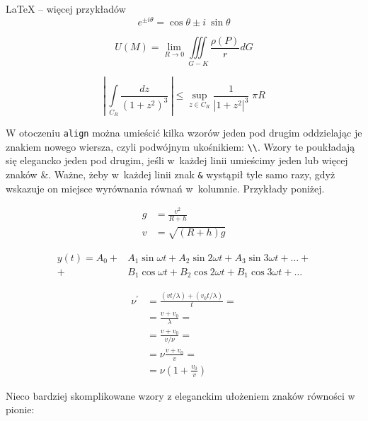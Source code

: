 \begin{easyappendix}{\LaTeX{} -- więcej przykładów}
\begin{equation}
	e^{\pm i\theta} = \cos \theta \pm i~\sin\theta
\end{equation}

\begin{equation}
	U(M) = \lim\limits_{R\to 0} \iiint\limits_{G-K}\frac{\rho(P)}{r}dG
\end{equation}

\begin{equation*}
	\left| \, \int\limits_{C_R} \frac{dz}{\left( 1+z^2 \right )^3} \, \right| \leqslant \sup\limits_{z \in C_R} \frac{1}{\left| 1+z^2 \right|^3} \; \pi R
\end{equation*}

W otoczeniu \texttt{align} można umieścić kilka wzorów jeden pod drugim oddzielając je znakiem nowego wiersza, czyli podwójnym ukośnikiem: \texttt{\textbackslash{}\textbackslash{}}. Wzory te poukładają się elegancko jeden pod drugim, jeśli w~każdej linii umieścimy jeden lub więcej znaków \&. Ważne, żeby w~każdej linii znak \texttt{\&} wystąpił tyle samo razy, gdyż wskazuje on miejsce wyrównania równań w~kolumnie. Przykłady poniżej.

\begin{align}
	g & = \frac{v^2}{R+h} \\
	v & = \sqrt{ \left( R+h \right) g }
\end{align}

\begin{align}
	y(t) = A_0 
	+& A_1 \sin \omega t + 
	A_2 \sin 2 \omega t + 
	A_3 \sin 3 \omega t + \ldots + \nonumber \\
	+& B_1 \cos \omega t + 
	B_2 \cos 2 \omega t + 
	B_1 \cos 3 \omega t + \ldots
\end{align}

\begin{align}
	\nu^\prime  &= \frac{\left(vt / \lambda \right) + \left( v_0t / \lambda \right)}{t} = \nonumber\\
	&= \frac{v + v_0}{\lambda} = \nonumber\\
	&= \frac{v + v_0}{v / \nu} = \nonumber\\
	&= \nu \frac{v+v_0}{v} = \nonumber\\
	&= \nu \left( 1 + \frac{v_0}{v} \right)
\end{align}

Nieco bardziej skomplikowane wzory z eleganckim ułożeniem znaków równości w pionie:


\end{easyappendix}
